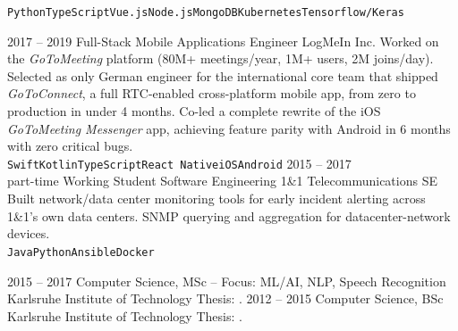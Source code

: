 \documentclass[8pt]{developercv} %
\newcommand{\linebreaksmall}{\vspace{2mm}}
\begin{document}
\begin{entrylist}
{\begin{itemize}[leftmargin=*, noitemsep, topsep=0pt, partopsep=0pt, parsep=0pt]
        \end{itemize}
        \texttt{Python}\slashsep\texttt{TypeScript}\slashsep\texttt{Vue.js}\slashsep\texttt{Node.js}\slashsep\texttt{MongoDB}\slashsep\texttt{Kubernetes}\slashsep\texttt{Tensorflow/Keras}} \linebreaksmall
        \entry
        {2017 -- 2019}
        {Full-Stack Mobile Applications Engineer}
        {LogMeIn Inc.}
        {Worked on the \textit{GoToMeeting} platform (80M+ meetings/year, 1M+ users, 2M joins/day). Selected as only German engineer for the international core team that shipped \textit{GoToConnect}, a full RTC-enabled cross-platform mobile app, from zero to production in under 4 months. Co-led a complete rewrite of the iOS \textit{GoToMeeting Messenger} app, achieving feature parity with Android in 6 months with zero critical bugs.
        \linebreaksmall \\ \texttt{Swift}\slashsep\texttt{Kotlin}\slashsep\texttt{TypeScript}\slashsep\texttt{React Native}\slashsep\texttt{iOS}\slashsep\texttt{Android}} \linebreaksmall
        \entry
        {2015 -- 2017\\\footnotesize{part-time}}
        {Working Student Software Engineering}
        {1\&1 Telecommunications SE}
        {Built network/data center monitoring tools for early incident alerting across 1\&1's own data centers. SNMP querying and aggregation for datacenter-network devices.
        \linebreaksmall \\ \texttt{Java}\slashsep\texttt{Python}\slashsep\texttt{Ansible}\slashsep\texttt{Docker}}
    \end{entrylist}



    \begin{entrylist}
        \entry
        {2015 -- 2017}
        {Computer Science, MSc -- Focus: ML/AI, NLP, Speech Recognition}
        {Karlsruhe Institute of Technology}
        {Thesis: .}
        \entry
        {2012 -- 2015}
        {Computer Science, BSc}
        {Karlsruhe Institute of Technology}
        {Thesis: .}
    \end{entrylist}
\end{document}
